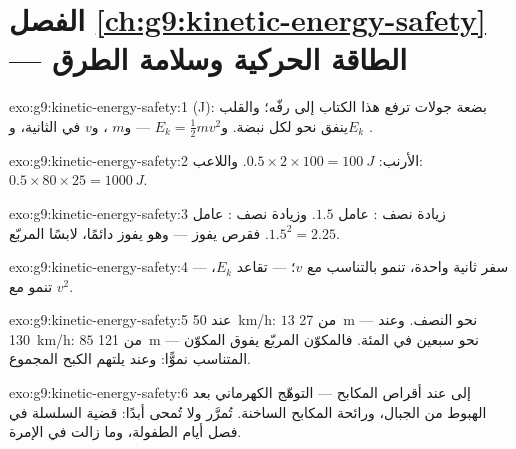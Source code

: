 \section*{الفصل \ref{ch:g9:kinetic-energy-safety} --- الطاقة الحركية وسلامة الطرق}

\begin{solution}{exo:g9:kinetic-energy-safety:1}
 (\unit{J}): بضعة جولات ترفع هذا الكتاب إلى رفّه؛ والقلب
ينفق نحو  لكل نبضة. و$E_k = \frac12 m v^2$ --- و$m$
، و$v$  في الثانية، و$E_k$ .
\end{solution}

\begin{solution}{exo:g9:kinetic-energy-safety:2}
الأرنب: $0.5 \times 2 \times 100 = \qty{100}{J}$. واللاعب:
$0.5 \times 80 \times 25 = \qty{1000}{J}$.
\end{solution}

\begin{solution}{exo:g9:kinetic-energy-safety:3}
زيادة نصف : عامل $1.5$. وزيادة نصف : عامل
$1.5^2 = 2.25$. فقرص  يفوز --- وهو يفوز دائمًا، لابسًا
المربّع.
\end{solution}

\begin{solution}{exo:g9:kinetic-energy-safety:4}
 --- سفر ثانية واحدة، تنمو بالتناسب مع $v$؛
 --- تقاعد $E_k$، تنمو مع $v^2$.
\end{solution}

\begin{solution}{exo:g9:kinetic-energy-safety:5}
عند \qty{50}{km/h}: $13$ من \qty{27}{m} --- نحو النصف. وعند
\qty{130}{km/h}: $85$ من \qty{121}{m} --- نحو سبعين في المئة.
فالمكوّن المربّع يفوق المكوّن المتناسب نموًّا: وعند 
يلتهم الكبح المجموع.
\end{solution}

\begin{solution}{exo:g9:kinetic-energy-safety:6}
إلى  عند أقراص المكابح --- التوهّج الكهرماني بعد الهبوط
من الجبال، ورائحة المكابح الساخنة.  تُمرَّر ولا تُمحى
أبدًا: قضية السلسلة في فصل  أيام الطفولة، وما زالت في
الإمرة.
\end{solution}

